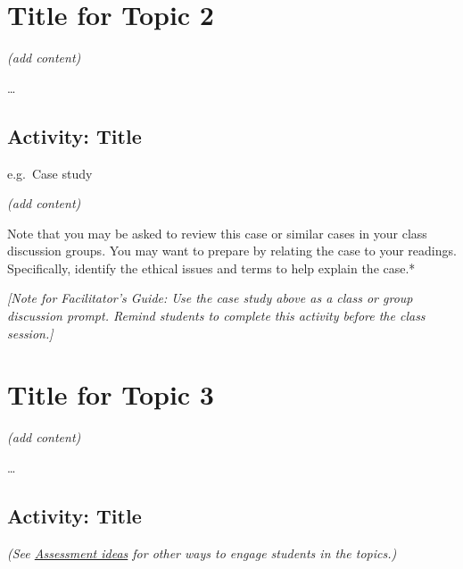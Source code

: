 \documentclass[
  letterpaper,
  DIV=11,
  numbers=noendperiod]{scrreprt}
\begin{document}
\section{Title for Topic 2}\label{title-for-topic-2}

\emph{(add content)}

\ldots{}

\subsection*{Activity: Title}\label{activity-title}

\begin{tcolorbox}[enhanced jigsaw, colbacktitle=quarto-callout-note-color!10!white, coltitle=black, colframe=quarto-callout-note-color-frame, rightrule=.15mm, bottomrule=.15mm, title={Learning Activity}, bottomtitle=1mm, left=2mm, toprule=.15mm, opacitybacktitle=0.6, arc=.35mm, opacityback=0, toptitle=1mm, breakable, leftrule=.75mm, titlerule=0mm, colback=white]

e.g.~Case study

\emph{(add content)}

Note that you may be asked to review this case or similar cases in your
class discussion groups. You may want to prepare by relating the case to
your readings. Specifically, identify the ethical issues and terms to
help explain the case.*

\emph{{[}Note for Facilitator's Guide: Use the case study above as a
class or group discussion prompt. Remind students to complete this
activity before the class session.{]}}

\end{tcolorbox}

\section{Title for Topic 3}\label{title-for-topic-3}

\emph{(add content)}

\ldots{}

\subsection*{Activity: Title}\label{activity-title-1}

\begin{tcolorbox}[enhanced jigsaw, colbacktitle=quarto-callout-note-color!10!white, coltitle=black, colframe=quarto-callout-note-color-frame, rightrule=.15mm, bottomrule=.15mm, title={Learning Activity}, bottomtitle=1mm, left=2mm, toprule=.15mm, opacitybacktitle=0.6, arc=.35mm, opacityback=0, toptitle=1mm, breakable, leftrule=.75mm, titlerule=0mm, colback=white]

\emph{(See
\href{https://multi-access.twu.ca/assessment/assessment-ideas}{Assessment
ideas} for other ways to engage students in the topics.)}

\end{tcolorbox}
\end{document}
